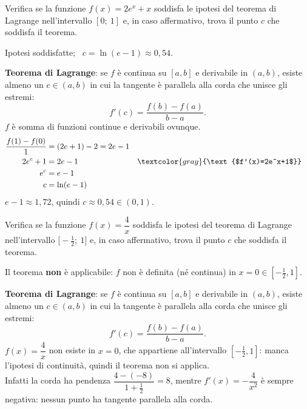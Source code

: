 
\begin{question}[ID=1.5, subtitle={Teorema di Lagrange per $f(x)=2e^x+x$ su $[0,1]$}, tags={lagrange, teoremi}, difficulty=media]
Verifica se la funzione \(f(x) = 2e^x + x\) soddisfa le ipotesi del teorema di Lagrange nell'intervallo \([0;\ 1]\) e, in caso affermativo, trova il punto \(c\) che soddisfa il teorema.
\begin{solution}
Ipotesi soddisfatte; \ $c=\ln(e-1)\approx0{,}54$.
\end{solution}
\begin{explanation}
\textbf{Teorema di Lagrange}: se $f$ è continua su $[a,b]$ e derivabile in $(a,b)$, esiste almeno un $c\in(a,b)$ in cui la tangente è parallela alla corda che unisce gli estremi:
\[ f'(c)=\dfrac{f(b)-f(a)}{b-a}. \]
$f$ è somma di funzioni continue e derivabili ovunque.
\[\begin{aligned}
\dfrac{f(1)-f(0)}{1} &= (2e+1)-2=2e-1\\
2e^c+1 &= 2e-1 && \textcolor{gray}{\text{$f'(x)=2e^x+1$}}\\
e^c &= e-1\\
c &= \ln(e-1)
\end{aligned}\]
$e-1\approx1{,}72$, quindi $c\approx0{,}54\in(0,1)$.
\end{explanation}
\end{question}


\begin{question}[ID=1.6, subtitle={Teorema di Lagrange non applicabile: $f(x)=4/x$ su $[-1/2,1]$}, tags={lagrange, teoremi, non applicabile}, difficulty=facile]
Verifica se la funzione \(f(x) = \dfrac{4}{x}\) soddisfa le ipotesi del teorema di Lagrange nell'intervallo \(\bigl[-\tfrac{1}{2};\ 1\bigr]\) e, in caso affermativo, trova il punto \(c\) che soddisfa il teorema.
\begin{solution}
Il teorema \textbf{non} è applicabile: $f$ non è definita (né continua) in $x=0\in\left[-\tfrac12,1\right]$.
\end{solution}
\begin{explanation}
\textbf{Teorema di Lagrange}: se $f$ è continua su $[a,b]$ e derivabile in $(a,b)$, esiste almeno un $c\in(a,b)$ in cui la tangente è parallela alla corda che unisce gli estremi:
\[ f'(c)=\dfrac{f(b)-f(a)}{b-a}. \]
$f(x)=\dfrac4x$ non esiste in $x=0$, che appartiene all'intervallo $\left[-\tfrac12,1\right]$: manca l'ipotesi di continuità, quindi il teorema non si applica. \\
Infatti la corda ha pendenza $\dfrac{4-(-8)}{1+\frac12}=8$, mentre $f'(x)=-\dfrac4{x^2}$ è sempre negativa: nessun punto ha tangente parallela alla corda.
\end{explanation}
\end{question}

